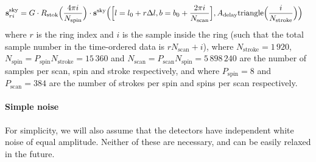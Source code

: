 \documentclass{article}
\renewcommand{\vec}[1]{{\bf #1}}
\begin{document}
\begin{align}
	\vec s^\textrm{sky}_{ri} &= G \cdot
		R_\textrm{stok}\Big(\frac{4\pi i}{N_\textrm{spin}}\Big) \cdot
		\vec s^\textrm{sky}\Big(\Big[l=l_0+r\Delta l,b=b_0+\frac{2\pi i}{N_\textrm{scan}}\Big],
		A_\textrm{delay}\textrm{triangle}\Big(\frac{i}{N_\textrm{stroke}}\Big)\Big)
		\label{eq:sring}
\end{align}
where $r$ is the ring index and $i$ is the sample inside the ring (such
that the total sample number in the time-ordered data is $rN_\textrm{scan}+i$),
where $N_\textrm{stroke} = 1\,920$, $N_\textrm{spin} = P_\textrm{spin}N_\textrm{stroke}
= 15\,360$ and $N_\textrm{scan} = P_\textrm{scan}N_\textrm{spin} = 5\,898\,240$
are the number of samples per scan, spin and stroke respectively, and where
$P_\textrm{spin} = 8$ and $P_\textrm{scan} = 384$ are the number of
strokes per spin and spins per scan respectively.

\paragraph{Simple noise}
For simplicity, we will also assume that the detectors have independent white
noise of equal amplitude. Neither of these are necessary, and can be easily
relaxed in the future.
\end{document}

